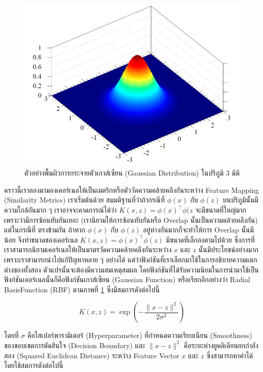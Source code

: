 \begin{figure}[htbp]
    \centering
    \includegraphics[width=0.8\linewidth]{fig/gaussian-3d.png}
    \caption{ตัวอย่างพื้นผิวการกระจายตัวเกาส์เซียน (Gaussian Distribution) ในปริภูมิ 3 มิติ}
    \label{fig:gaussian_3d}
\end{figure}

คราวนี้เราลองมามองเคอร์เนลให้เป็นเมตริกหรือตัววัดความคล้ายคลึงกันระหว่าง Feature Mapping (Similarity Metrics) เราเริ่มต้นด้วย%
สมมติฐานที่ว่าถ้ากรณีที่ $\phi(x)$ กับ $\phi(z)$ บนปริภูมินั้นมีความใกล้กันมาก ๆ เราอาจจะคาดการณ์ได้ว่า $K(x,z) = \phi(x)^{\top} 
\phi(z$ จะมีขนาดที่ใหญ่มากเพราะว่ามีการซ้อนทับกันเยอะ (เรานิยามให้การซ้อนทับกันหรือ Overlap นั้นเป็นความคล้ายคลึงกัน) แต่ในกรณีที่%
ตรงข้ามกัน ถ้าหาก $\phi(x)$ กับ $\phi(z)$ อยู่ห่างกันมากก็จะทำให้การ Overlap นั้นมีน้อย จึงทำขนาดของเคอร์เนล $K(x,z) = 
\phi(x)^{\top} \phi(z)$ มีขนาดที่เล็กลงตามไปด้วย ซึ่งการที่เราสามารถนิยามเคอร์เนลให้เป็นมาตรวัดความคล้ายคลึงกันระหว่าง $x$ และ 
$z$ นั้นมีประโยชน์อย่างมาก เพราะเราสามารถนำไปแก้ปัญหาหลาย ๆ อย่างได้ แต่ว่าฟังก์ชันที่เราเลือกมาใช้ในการอธิบายความแตกต่างของทั้งสอง%
ตัวแปรนั้นจะต้องมีความสมเหตุสมผล โดยฟังก์ชันที่ได้รับความนิยมในการนำมาใช้เป็นฟังก์ชันเคอร์เนลนั้นก็คือฟังก์ชันเกาส์เซียน (Gaussian 
Function) หรือเรียกอีกอย่างว่า Radial BasisFunction (RBF) ตามภาพที่ \ref{fig:gaussian_3d} ซึ่งมีสมการดังต่อไปนี้ 

\begin{equation}\label{eq:rbf_kernel}
    K(x,z) = \exp\left(-\frac{\lVert x - z \rVert^2}{2\sigma^2}\right)   
\end{equation}

\noindent โดยที่ $\sigma$ คือไฮเปอร์พารามิเตอร์ (Hyperparameter) ที่กำหนดความเรียบเนียน (Smoothness) ของขอบเขตการตัดสินใจ 
(Decision Boundary) และ $\lVert x - z \rVert^2$ คือระยะห่างยูคลิเดียนยกกำลังสอง (Squared Euclidean Distance) ระหว่าง 
Feature Vector $x$ และ $z$ ซึ่งสามารถหาค่าได้โดยใช้สมการดังต่อไปนี้

